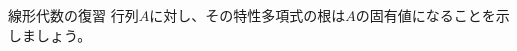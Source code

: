 \documentclass[11pt,b5paper,oneside,titlepage,lualatex]{ltjsreport}
\numberwithin{equation}{section} %
\begin{document}


\begin{exc}{線形代数の復習}{}
	行列$ A $に対し、その特性多項式の根は$ A $の固有値になることを示しましょう。
\end{exc}

\clearpage






\chapter{} \label{chap:}






\section{} \label{sec:}





\section{} \label{sec:}





\clearpage





\chapter{} \label{chap:}

\end{document}
